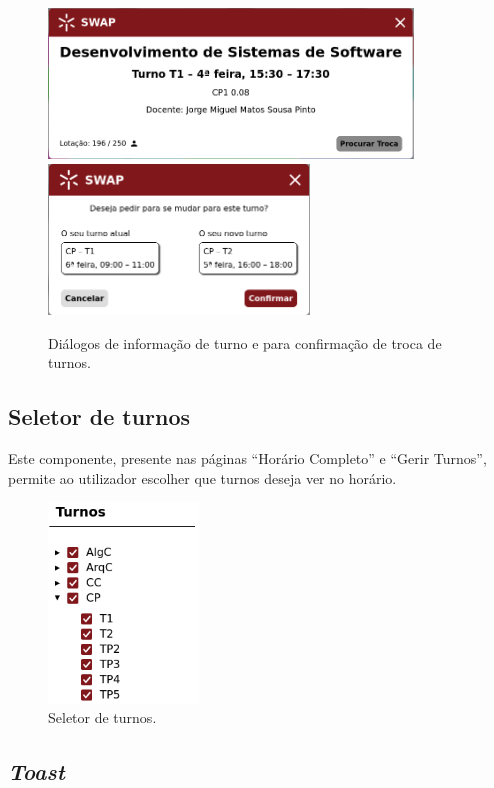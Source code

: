 \documentclass[12pt, a4paper]{article}
\begin{document}
\begin{figure}[H]
    \centering
    \includegraphics[height=4cm]{res/components/popup-1.png}
    \includegraphics[height=4cm]{res/components/popup-2.png}
    \caption{Diálogos de informação de turno e para confirmação de troca de turnos.}
    \label{popup}
\end{figure}

\subsection{Seletor de turnos}

Este componente, presente nas páginas ``Horário Completo'' e ``Gerir Turnos'', permite ao utilizador
escolher que turnos deseja ver no horário.

\begin{figure}[H]
    \centering
    \includegraphics[width=4cm]{res/components/shift-selector.png}
    \caption{Seletor de turnos.}
    \label{shift-selector}
\end{figure}

\subsection{\emph{Toast}}
\end{document}
